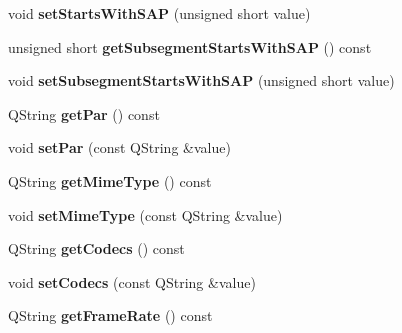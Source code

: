 \begin{DoxyCompactItemize}
\item 
\hypertarget{class_adaptation_set_a9ea5b3ba16531eeae0157cdcceecb1a8}{void {\bfseries set\-Starts\-With\-S\-A\-P} (unsigned short value)}\label{class_adaptation_set_a9ea5b3ba16531eeae0157cdcceecb1a8}

\item 
\hypertarget{class_adaptation_set_ac19742543a7d2e07455c7bcdcbbbbd27}{unsigned short {\bfseries get\-Subsegment\-Starts\-With\-S\-A\-P} () const }\label{class_adaptation_set_ac19742543a7d2e07455c7bcdcbbbbd27}

\item 
\hypertarget{class_adaptation_set_a5ca94f383ef91de91fda496c5e389f2c}{void {\bfseries set\-Subsegment\-Starts\-With\-S\-A\-P} (unsigned short value)}\label{class_adaptation_set_a5ca94f383ef91de91fda496c5e389f2c}

\item 
\hypertarget{class_adaptation_set_a8291072d0eab9f204e4d87752debb231}{Q\-String {\bfseries get\-Par} () const }\label{class_adaptation_set_a8291072d0eab9f204e4d87752debb231}

\item 
\hypertarget{class_adaptation_set_a28ca0e4b21b1fceee1e91205061970e8}{void {\bfseries set\-Par} (const Q\-String \&value)}\label{class_adaptation_set_a28ca0e4b21b1fceee1e91205061970e8}

\item 
\hypertarget{class_adaptation_set_a9376140362b7a139bbabc1c834dda869}{Q\-String {\bfseries get\-Mime\-Type} () const }\label{class_adaptation_set_a9376140362b7a139bbabc1c834dda869}

\item 
\hypertarget{class_adaptation_set_afa7be8f5ba4b93d7da1700da9c092b57}{void {\bfseries set\-Mime\-Type} (const Q\-String \&value)}\label{class_adaptation_set_afa7be8f5ba4b93d7da1700da9c092b57}

\item 
\hypertarget{class_adaptation_set_a84d2109beb082510fd6b8b602125fa36}{Q\-String {\bfseries get\-Codecs} () const }\label{class_adaptation_set_a84d2109beb082510fd6b8b602125fa36}

\item 
\hypertarget{class_adaptation_set_ab09d613f80b2c892b3d2f635c124e220}{void {\bfseries set\-Codecs} (const Q\-String \&value)}\label{class_adaptation_set_ab09d613f80b2c892b3d2f635c124e220}

\item 
\hypertarget{class_adaptation_set_a0761da412e013f0bffabdd6340e353d9}{Q\-String {\bfseries get\-Frame\-Rate} () const }\label{class_adaptation_set_a0761da412e013f0bffabdd6340e353d9}


\end{DoxyCompactItemize}
